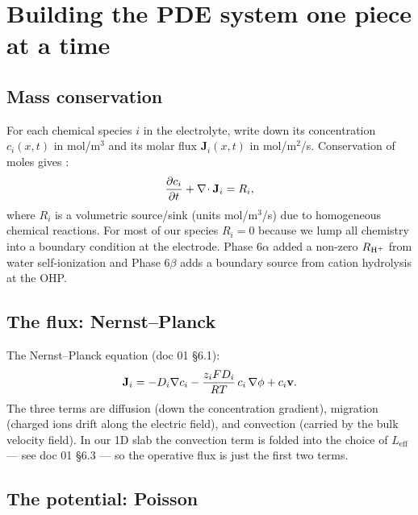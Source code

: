 \documentclass[11pt]{article}
\begin{document}
\section{Building the PDE system one piece at a time}

\subsection{Mass conservation}

For each chemical species $i$ in the electrolyte, write down its
concentration $c_i(x,t)$ in mol/m$^3$ and its molar flux
$\mathbf{J}_i(x,t)$ in mol/m$^2$/s. Conservation of moles gives
:
\begin{equation}
  \frac{\partial c_i}{\partial t} + \nabla\!\cdot \mathbf{J}_i = R_i,
  \label{eq:mass}
\end{equation}
where $R_i$ is a volumetric source/sink (units mol/m$^3$/s) due to
homogeneous chemical reactions. For most of our species $R_i = 0$
because we lump all chemistry into a boundary condition at the
electrode. Phase 6$\alpha$ added a non-zero $R_{\mathrm{H^+}}$ from water
self-ionization and Phase 6$\beta$ adds a boundary source from
cation hydrolysis at the OHP.

\subsection{The flux: Nernst--Planck}

The Nernst--Planck equation (doc 01 \S 6.1):
\begin{equation}
  \mathbf{J}_i = -D_i \nabla c_i
                 - \frac{z_i F D_i}{RT}\, c_i\, \nabla\phi
                 + c_i \mathbf{v}.
  \label{eq:np-2}
\end{equation}
The three terms are diffusion (down the concentration gradient),
migration (charged ions drift along the electric field), and
convection (carried by the bulk velocity field). In our 1D slab the
convection term is folded into the choice of $L_{\mathrm{eff}}$ ---
see doc 01 \S 6.3 --- so the operative flux is just the first two
terms.

\subsection{The potential: Poisson}
\end{document}
